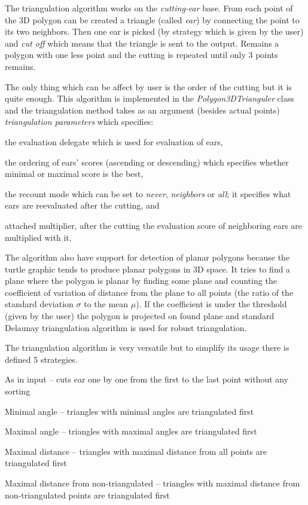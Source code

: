 The triangulation algorithm works on the \emph{cutting-ear} base.
From each point of the 3D polygon can be created a triangle (called \emph{ear}) by connecting the point to its two neighbors.
Then one ear is picked (by strategy which is given by the user) and \emph{cut off} which means that the triangle is sent to the output.
Remains a polygon with one less point and the cutting is repeated until only 3 points remains.

The only thing which can be affect by user is the order of the cutting but it is quite enough.
This algorithm is implemented in the \emph{Polygon3DTrianguler} class and the triangulation method takes as an argument (besides actual points) \emph{triangulation parameters} which specifies:
	\begin{inparaenum}[{\itshape a})]
		\item the evaluation delegate which is used for evaluation of ears,
		\item the ordering of ears' scores (ascending or descending) which specifies whether minimal or maximal score is the best,
		\item the recount mode which can be set to \emph{never}, \emph{neighbors} or \emph{all}; it specifies what ears are reevaluated after the cutting, and
		\item attached multiplier, after the cutting the evaluation score of neighboring ears are multiplied with it.
	\end{inparaenum}
	
The algorithm also have support for detection of planar polygons because the turtle graphic tends to produce planar polygons in 3D space.
It tries to find a plane where the polygon is planar by finding some plane and counting the coefficient of variation of distance from the plane to all points
	(the ratio of the standard deviation $\sigma$ to the mean $\mu$).
If the coefficient is under the threshold (given by the user) the polygon is projected on found plane and standard Delaunay triangulation algorithm is used for robust triangulation.


The triangulation algorithm is very versatile but to simplify its usage there is defined 5 strategies.

\begin{description*}
	\item[As in input] -- cuts ear one by one from the first to the last point without any sorting
	\item[Minimal angle] -- triangles with minimal angles are triangulated first
	\item[Maximal angle] -- triangles with maximal angles are triangulated first
	\item[Maximal distance] -- triangles with maximal distance from all points are triangulated first
	\item[Maximal distance from non-triangulated] -- triangles with maximal distance from non-triangulated points are triangulated first
\end{description*}

